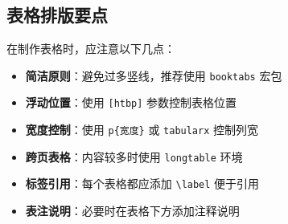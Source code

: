 \subsection{表格排版要点}%
\label{subsec:table-tips}

在制作表格时，应注意以下几点：

\begin{itemize}
    \item \textbf{简洁原则}：避免过多竖线，推荐使用 \texttt{booktabs} 宏包
    \item \textbf{浮动位置}：使用 \texttt{[htbp]} 参数控制表格位置
    \item \textbf{宽度控制}：使用 \texttt{p\{宽度\}} 或 \texttt{tabularx} 控制列宽
    \item \textbf{跨页表格}：内容较多时使用 \texttt{longtable} 环境
    \item \textbf{标签引用}：每个表格都应添加 \texttt{\textbackslash label} 便于引用
    \item \textbf{表注说明}：必要时在表格下方添加注释说明
\end{itemize}


